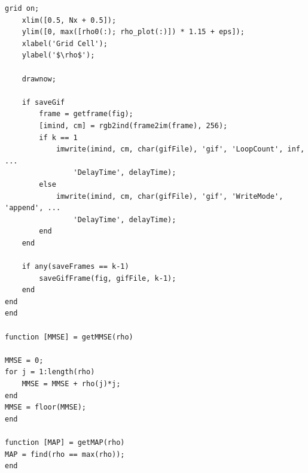 \documentclass[11pt]{article}
\begin{document}
\begin{lstlisting}[style = matlab]
    grid on;
    xlim([0.5, Nx + 0.5]);
    ylim([0, max([rho0(:); rho_plot(:)]) * 1.15 + eps]);
    xlabel('Grid Cell');
    ylabel('$\rho$');

    drawnow;

    if saveGif
        frame = getframe(fig);
        [imind, cm] = rgb2ind(frame2im(frame), 256);
        if k == 1
            imwrite(imind, cm, char(gifFile), 'gif', 'LoopCount', inf, ...
                'DelayTime', delayTime);
        else
            imwrite(imind, cm, char(gifFile), 'gif', 'WriteMode', 'append', ...
                'DelayTime', delayTime);
        end
    end

    if any(saveFrames == k-1)
        saveGifFrame(fig, gifFile, k-1);
    end
end
end

function [MMSE] = getMMSE(rho)

MMSE = 0;
for j = 1:length(rho)
    MMSE = MMSE + rho(j)*j;
end
MMSE = floor(MMSE);
end

function [MAP] = getMAP(rho)
MAP = find(rho == max(rho));
end

\end{lstlisting}




\end{document}
